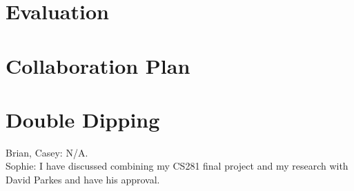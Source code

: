 \documentclass[a4paper, 11pt]{article}
\begin{document}
\section{Evaluation}

\section{Collaboration Plan}

\section{Double Dipping}
Brian, Casey: N/A. \\
Sophie: I have discussed combining my CS281 final project and my research with David Parkes and have his approval.



\end{document}
